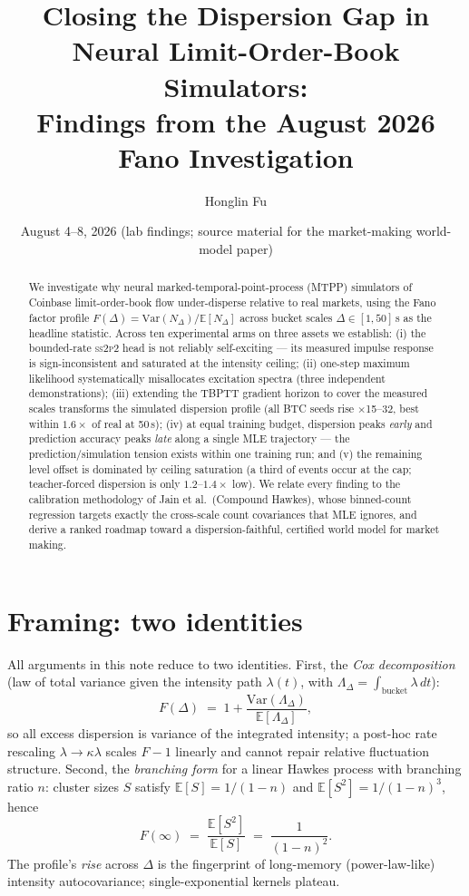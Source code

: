\documentclass[11pt]{article}
\title{Closing the Dispersion Gap in Neural Limit-Order-Book Simulators:\\
Findings from the August 2026 Fano Investigation}
\author{Honglin Fu}
\date{August 4--8, 2026 \quad (lab findings; source material for the market-making world-model paper)}
\newcommand{\sspp}{\textsc{ss2p2}}
\newcommand{\Fano}{F}
\begin{document}
\maketitle

\begin{abstract}
We investigate why neural marked-temporal-point-process (MTPP) simulators of Coinbase
limit-order-book flow under-disperse relative to real markets, using the Fano factor
profile $\Fano(\Delta)=\mathrm{Var}(N_\Delta)/\mathbb{E}[N_\Delta]$ across bucket scales
$\Delta\in[1,50]$\,s as the headline statistic. Across ten experimental arms on three
assets we establish: (i) the bounded-rate \sspp{} head is not reliably self-exciting
--- its measured impulse response is sign-inconsistent and saturated at the intensity
ceiling; (ii) one-step maximum likelihood systematically misallocates excitation
spectra (three independent demonstrations); (iii) extending the TBPTT gradient horizon
to cover the measured scales transforms the simulated dispersion profile (all BTC seeds
rise $\times$15--32, best within $1.6\times$ of real at 50\,s); (iv) at equal training
budget, dispersion peaks \emph{early} and prediction accuracy peaks \emph{late} along a
single MLE trajectory --- the prediction/simulation tension exists within one training
run; and (v) the remaining level offset is dominated by ceiling saturation (a third of
events occur at the cap; teacher-forced dispersion is only $1.2$--$1.4\times$ low).
We relate every finding to the calibration methodology of Jain et al.\ (Compound
Hawkes), whose binned-count regression targets exactly the cross-scale count
covariances that MLE ignores, and derive a ranked roadmap toward a dispersion-faithful,
certified world model for market making.
\end{abstract}

\section{Framing: two identities}

All arguments in this note reduce to two identities. First, the \emph{Cox
decomposition} (law of total variance given the intensity path $\lambda(t)$, with
$\Lambda_\Delta=\int_{\text{bucket}}\lambda\,dt$):
\begin{equation}
\Fano(\Delta) \;=\; 1+\frac{\mathrm{Var}(\Lambda_\Delta)}{\mathbb{E}[\Lambda_\Delta]},
\label{eq:cox}
\end{equation}
so all excess dispersion is variance of the integrated intensity; a post-hoc rate
rescaling $\lambda\!\to\!\kappa\lambda$ scales $\Fano-1$ linearly and cannot repair
relative fluctuation structure. Second, the \emph{branching form} for a linear Hawkes
process with branching ratio $n$: cluster sizes $S$ satisfy $\mathbb{E}[S]=1/(1-n)$ and
$\mathbb{E}[S^2]=1/(1-n)^3$, hence
\begin{equation}
\Fano(\infty)\;=\;\frac{\mathbb{E}[S^2]}{\mathbb{E}[S]}\;=\;\frac{1}{(1-n)^2}.
\label{eq:branching}
\end{equation}
The profile's \emph{rise} across $\Delta$ is the fingerprint of long-memory (power-law-like)
intensity autocovariance; single-exponential kernels plateau.
\end{document}
